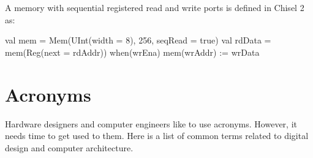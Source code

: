 \documentclass[%
    10pt,
    headinclude, footexclude,
    openright, %
    notitlepage,
    cleardoubleempty,
    headsepline,
    pointlessnumbers,
    bibtotoc, idxtotoc,
    ]{scrbook}
\begin{document}


A memory with sequential registered read and write ports is defined in Chisel 2 as:

\begin{chisel}
  val mem = Mem(UInt(width = 8), 256, seqRead = true)
  val rdData = mem(Reg(next = rdAddr))
  when(wrEna) {
    mem(wrAddr) := wrData
  }
\end{chisel}

\chapter{Acronyms}

Hardware designers and computer engineers like to use acronyms.
However, it needs time to get used to them. Here is a list of common terms
related to digital design and computer architecture.
\end{document}
